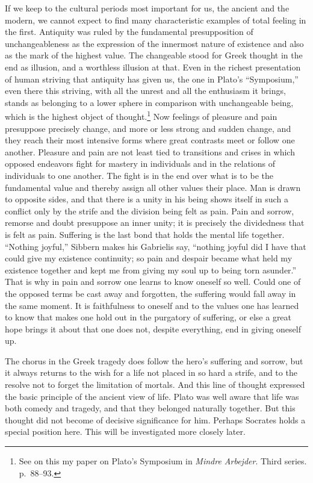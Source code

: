 \documentclass[12pt]{book}
\newcommand{\opage}[1]{\marginnote{\footnotesize\textit{[#1]}}}
\begin{document}
If we keep to the cultural periods most important for us, the ancient and the
modern, we cannot expect to find many characteristic examples of total feeling in
the first. Antiquity was ruled by the fundamental presupposition of
unchangeableness as the expression of the innermost nature of existence and also
as the mark of the highest value. The changeable \opage{38}stood for Greek thought
in the end as illusion, and a worthless illusion at that. Even in the richest
presentation of human striving that antiquity has given us, the one in Plato's
``Symposium,'' even there this striving, with all the unrest and all the
enthusiasm it brings, stands as belonging to a lower sphere in comparison with
unchangeable being, which is the highest object of thought.\footnote{See on this
my paper on Plato's Symposium in \textit{Mindre Arbejder}. Third series.
p.~88--93.} Now feelings of pleasure and pain presuppose precisely change, and
more or less strong and sudden change, and they reach their most intensive forms
where great contrasts meet or follow one another. Pleasure and pain are not least
tied to transitions and crises in which opposed endeavors fight for mastery in
individuals and in the relations of individuals to one another. The fight is in
the end over what is to be the fundamental value and thereby assign all other
values their place. Man is drawn to opposite sides, and that there is a unity in
his being shows itself in such a conflict only by the strife and the division
being felt as pain. Pain and sorrow, remorse and doubt presuppose an inner unity;
it is precisely the dividedness that is felt as pain. Suffering is the last bond
that holds the mental life together. ``Nothing joyful,'' Sibbern makes his
Gabrielis say, ``nothing joyful did I have that could give my existence
continuity; so pain and despair became what held my existence together and kept me
from giving my soul up to being torn asunder.'' That is why in pain and sorrow one
learns to know oneself so well. Could one of the opposed terms be cast away and
forgotten, the suffering would fall away in the same moment. It is faithfulness
to oneself and to the values one has learned to know that makes one hold out in
the purgatory of suffering, or else a great hope brings it about that one does
not, despite everything, end in giving oneself up.

The chorus in the Greek tragedy does follow the hero's suffering and sorrow, but
it always returns to the wish for a life not placed in so hard a strife, and to
the resolve not to forget the limitation of mortals. And this line of thought
expressed the basic principle of the ancient view of life. Plato was well aware
\opage{39}that life was both comedy and tragedy, and that they belonged naturally
together. But this thought did not become of decisive significance for him.
Perhaps Socrates holds a special position here. This will be investigated more
closely later.
\end{document}
